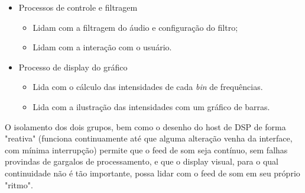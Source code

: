 \begin{itemize}
    \item Processos de controle e filtragem
    \begin{itemize}
        \item Lidam com a filtragem do áudio e configuração do filtro;
        \item Lidam com a interação com o usuário.
    \end{itemize}
    \item Processo de display do gráfico
    \begin{itemize}
        \item Lida com o cálculo das intensidades de cada \textit{bin} de frequências.
        \item Lida com a ilustração das intensidades com um gráfico de barras.
    \end{itemize}
\end{itemize}

O isolamento dos dois grupos, bem como o desenho do host de DSP de forma "reativa" (funciona continuamente até que alguma alteração venha da interface, com mínima interrupção) permite que o feed de som seja contínuo, sem falhas provindas de gargalos de processamento, e que o display visual, para o qual continuidade não é tão importante, possa lidar com o feed de som em seu próprio "ritmo".